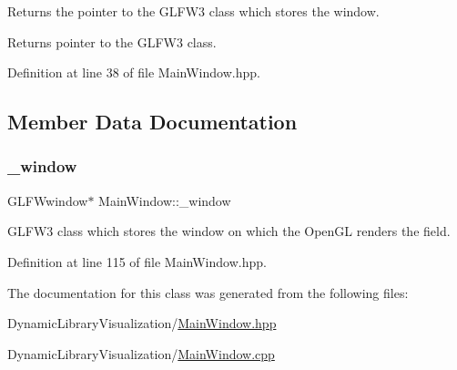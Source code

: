 Returns the pointer to the G\+L\+F\+W3 class which stores the window. 

\begin{DoxyReturn}{Returns}
pointer to the G\+L\+F\+W3 class. 
\end{DoxyReturn}


Definition at line 38 of file Main\+Window.\+hpp.



\subsection{Member Data Documentation}
\mbox{\label{class_main_window_a32bc8e4de92a68ff85f259b6420c372d}} 
\subsubsection{\texorpdfstring{\+\_\+window}{\_window}}
{\footnotesize\ttfamily G\+L\+F\+Wwindow$\ast$ Main\+Window\+::\+\_\+window\hspace{0.3cm}{\ttfamily [protected]}}

G\+L\+F\+W3 class which stores the window on which the Open\+GL renders the field. 

Definition at line 115 of file Main\+Window.\+hpp.



The documentation for this class was generated from the following files\+:\begin{DoxyCompactItemize}
\item 
Dynamic\+Library\+Visualization/\hyperlink{_main_window_8hpp}{Main\+Window.\+hpp}\item 
Dynamic\+Library\+Visualization/\hyperlink{_main_window_8cpp}{Main\+Window.\+cpp}\end{DoxyCompactItemize}
